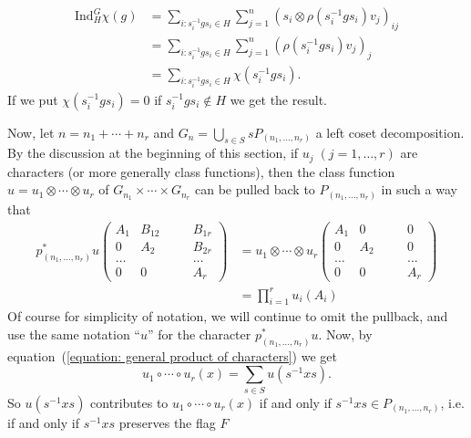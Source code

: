 \begin{equation}
\begin{split}
     \text{Ind}_H^G\chi(g)&=\sum_{i:s_i^{-1}gs_i\in H}\sum_{j=1}^n(s_i\otimes\rho(s_i^{-1}gs_i)v_j)_{ij}\\
     &=\sum_{i:s_i^{-1}gs_i\in H}\sum_{j=1}^n(\rho(s_i^{-1}gs_i)v_j)_j\\
     &=\sum_{i:s_i^{-1}gs_i\in H}\chi(s_i^{-1}gs_i).
\end{split}
\end{equation}
If we put $\chi(s_i^{-1}gs_i)=0$ if $s_i^{-1}gs_i\notin H$ we get the result.\par
Now, let $n=n_1+\cdots+n_r$ and $G_n=\bigcup_{s\in S}sP_{(n_1,\dots,n_r)}$ a left coset decomposition. By the discussion at the beginning of this section, if $u_j\;(j=1,\dots, r)$ are characters (or more generally class functions), then the class function $u=u_1\otimes\cdots\otimes u_r$ of $G_{n_1}\times\cdots\times G_{n_r}$ can be pulled back to $P_{(n_1,\dots,n_r)}$ in such a way that
\begin{equation}
\begin{split}
    p_{(n_1,\dots,n_r)}^*u\left(\begin{smallmatrix}
        A_1 & B_{12}&\quad &B_{1r}\\
         0 & A_2& &B_{2r}\\
          \dots& & &\dots\\
           0 & 0& &A_r
    \end{smallmatrix}\right) 
    &= u_1\otimes\cdots\otimes u_r\left(\begin{smallmatrix}
         A_1 & 0&\quad &0\\
         0 & A_2& &0\\
          \dots& & &\dots\\
           0 & 0& &A_r
    \end{smallmatrix}\right)\\
    &=\prod_{i=1}^ru_i(A_i)
\end{split}
\end{equation}
Of course for simplicity of notation, we will continue to omit the pullback, and use the same notation ``$u$'' for the character $p_{(n_1,\dots,n_r)}^*u$. Now, by equation~(\ref{equation: general product of characters}) we get
\begin{equation}
    u_1\circ\cdots\circ u_r(x)=\sum_{s\in S}u(s^{-1}xs).
\end{equation}
So $u(s^{-1}xs)$ contributes to $ u_1\circ\cdots\circ u_r(x)$ if and only if $s^{-1}xs\in P_{(n_1,\dots,n_r)}$, i.e. if and only if $s^{-1}xs$ preserves the flag $F$
